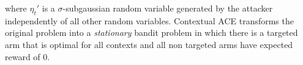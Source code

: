 where $\eta_{t}'$ is a $\sigma$-subgaussian random variable generated by the attacker independently of all other random variables. Contextual ACE transforms the original problem into a \emph{stationary} bandit problem in which there is a targeted arm that is optimal for all contexts and all non targeted arms have expected reward of $0$. 




